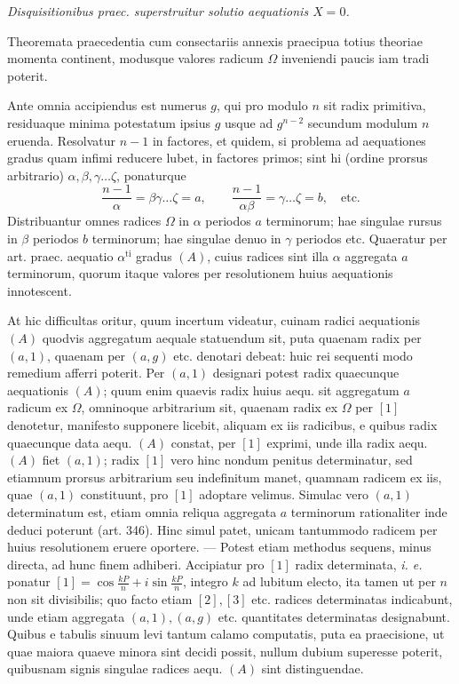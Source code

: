 \begin{center}\textit{Disquisitionibus praec. superstruitur solutio aequationis \(X=0\).}\end{center}


Theoremata praecedentia cum consectariis annexis praecipua totius theoriae momenta continent, modusque valores radicum \(\Omega\) inveniendi paucis iam tradi poterit.

Ante omnia accipiendus est numerus \(g\), qui pro modulo \(n\) sit radix primitiva, residuaque minima potestatum ipsius \(g\) usque ad \(g^{n-2}\) secundum modulum \(n\) eruenda. Resolvatur \(n-1\) in factores, et quidem, si problema ad aequationes gradus quam infimi reducere lubet, in factores primos; sint hi (ordine prorsus arbitrario) \(\alpha,\allowbreak \beta,\allowbreak \gamma\ldots\zeta\), ponaturque \[\frac{n-1}{\alpha}=\beta\gamma\ldots\zeta=a,\qquad\frac{n-1}{\alpha\beta}=\gamma\ldots\zeta=b,\quad\text{etc.}\] Distribuantur omnes radices \(\Omega\) in \(\alpha\) periodos \(a\) terminorum; hae singulae rursus in \(\beta\) periodos \(b\) terminorum; hae singulae denuo in \(\gamma\) periodos etc. Quaeratur per art. praec. aequatio \(\alpha^{\mathrm{ti}}\) gradus \((A)\), cuius radices sint illa \(\alpha\) aggregata \(a\) terminorum, quorum itaque valores per resolutionem huius aequationis innotescent.

At hic difficultas oritur, quum incertum videatur, cuinam radici aequationis \((A)\) quodvis aggregatum aequale statuendum sit, puta quaenam radix per \((a,1)\), quaenam per \((a,g)\) etc. denotari debeat: huic rei sequenti modo remedium afferri poterit. Per \((a,1)\) designari potest radix quaecunque aequationis \((A)\); quum enim quaevis radix huius aequ. sit aggregatum \(a\) radicum ex \(\Omega\), omninoque arbitrarium sit, quaenam radix ex \(\Omega\) per \([1]\) denotetur, manifesto supponere licebit, aliquam ex iis radicibus, e quibus radix quaecunque data aequ. \((A)\) constat, per \([1]\) exprimi, unde illa radix aequ. \((A)\) fiet \((a,1)\); radix \([1]\) vero hinc nondum penitus determinatur, sed etiamnum prorsus arbitrarium seu indefinitum manet, quamnam radicem ex iis, quae \((a,1)\) constituunt, pro \([1]\) adoptare velimus. Simulac vero \((a,1)\) determinatum est, etiam omnia reliqua aggregata \(a\) terminorum rationaliter inde deduci poterunt (art. 346). Hinc simul patet, unicam tantummodo radicem per huius resolutionem eruere oportere. — Potest etiam methodus sequens, minus directa, ad hunc finem adhiberi. Accipiatur pro \([1]\) radix determinata, \textit{i. e.} ponatur \([1]=\cos\frac{kP}{n}+i\sin\frac{kP}{n}\), integro \(k\) ad lubitum electo, ita tamen ut per \(n\) non sit divisibilis; quo facto etiam \([2],\allowbreak [3]\) etc. radices determinatas indicabunt, unde etiam aggregata \((a,1),\allowbreak (a,g)\) etc. quantitates determinatas designabunt. Quibus e tabulis sinuum levi tantum calamo computatis, puta ea praecisione, ut quae maiora quaeve minora sint decidi possit, nullum dubium superesse poterit, quibusnam signis singulae radices aequ. \((A)\) sint distinguendae.

